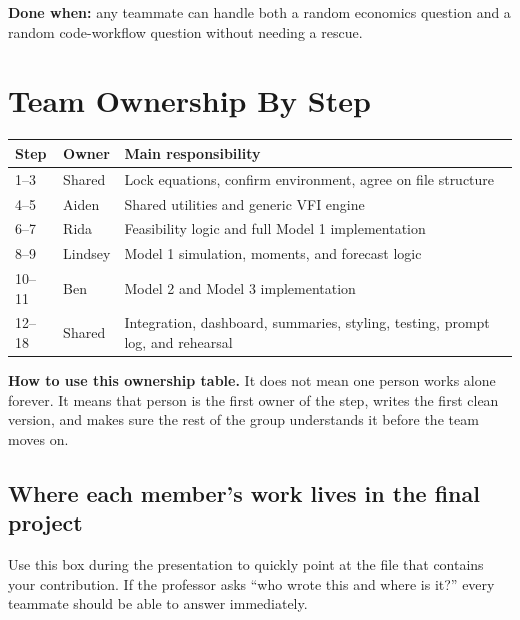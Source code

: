 \documentclass[11pt]{article}
\begin{document}
\textbf{Done when:} any teammate can handle both a random economics question and a random code-workflow question without needing a rescue.

\section{Team Ownership By Step}

\begin{tabularx}{\linewidth}{@{}p{1.3cm}p{2.2cm}X@{}}
\toprule
\textbf{Step} & \textbf{Owner} & \textbf{Main responsibility} \\
\midrule
1--3 & Shared & Lock equations, confirm environment, agree on file structure \\
4--5 & Aiden & Shared utilities and generic VFI engine \\
6--7 & Rida & Feasibility logic and full Model 1 implementation \\
8--9 & Lindsey & Model 1 simulation, moments, and forecast logic \\
10--11 & Ben & Model 2 and Model 3 implementation \\
12--18 & Shared & Integration, dashboard, summaries, styling, testing, prompt log, and rehearsal \\
\bottomrule
\end{tabularx}

\begin{notebox}
\textbf{How to use this ownership table.} It does not mean one person works alone forever. It means that person is the first owner of the step, writes the first clean version, and makes sure the rest of the group understands it before the team moves on.
\end{notebox}

\subsection{Where each member's work lives in the final project}

Use this box during the presentation to quickly point at the file that contains your contribution. If the professor asks ``who wrote this and where is it?'' every teammate should be able to answer immediately.
\end{document}
